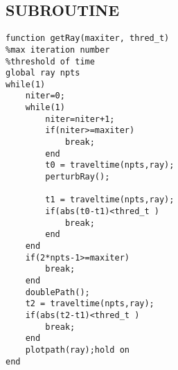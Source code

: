 \documentclass{article}
\begin{document}
\subsection{SUBROUTINE}
\begin{lstlisting}
function getRay(maxiter, thred_t)
%max iteration number
%threshold of time
global ray npts
while(1)
    niter=0;
    while(1)
        niter=niter+1;
        if(niter>=maxiter)
            break;
        end
        t0 = traveltime(npts,ray);
        perturbRay();

        t1 = traveltime(npts,ray);
        if(abs(t0-t1)<thred_t )
            break;
        end
    end
    if(2*npts-1>=maxiter)
        break;
    end
    doublePath();
    t2 = traveltime(npts,ray);
    if(abs(t2-t1)<thred_t )
        break;
    end
    plotpath(ray);hold on
end
\end{lstlisting}
\end{document}
